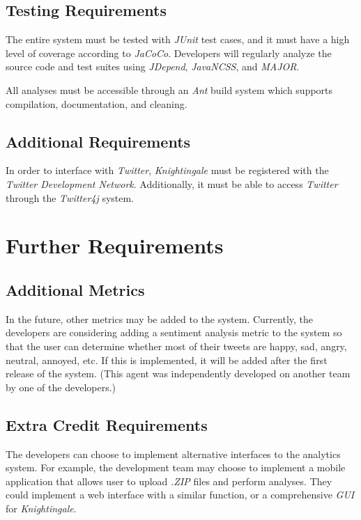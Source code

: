 \documentclass[a4paper, 12pt]{article}
\begin{document}
\subsection{Testing Requirements} \label{sec:testing}
\begin{adjustwidth}{2em}{0pt}
The entire system must be tested with \textit{JUnit} test cases, and it must have a high level of coverage according to \textit{JaCoCo}. Developers will regularly analyze the source code and test suites using \textit{JDepend}, \textit{JavaNCSS}, and \textit{MAJOR}. \newline 

\noindent All analyses must be accessible through an \textit{Ant} build system which supports compilation, documentation, and cleaning.
\end{adjustwidth}

\subsection{Additional Requirements} \label{sec:additional}
\begin{adjustwidth}{2em}{0pt}
In order to interface with \textit{Twitter}, \textit{Knightingale} must be registered with the \textit{Twitter Development Network}. Additionally, it must be able to access \textit{Twitter} through the \textit{Twitter4j} system.
\end{adjustwidth}

\section{Further Requirements} \label{sec:further}
\subsection{Additional Metrics} \label{sec:metrics}
\begin{adjustwidth}{2em}{0pt}
In the future, other metrics may be added to the system. Currently, the developers are considering adding a sentiment analysis metric to the system so that the user can determine whether most of their tweets are happy, sad, angry, neutral, annoyed, etc. If this is implemented, it will be added after the first release of the system. (This agent was independently developed on another team by one of the developers.) 
\end{adjustwidth}

\subsection{Extra Credit Requirements} \label{sec:extracredit}
\begin{adjustwidth}{2em}{0pt}
The developers can choose to implement alternative interfaces to the analytics system. For example, the development team may choose to implement a mobile application that allows user to upload \textit{.ZIP} files and perform analyses. They could implement a web interface with a similar function, or a comprehensive \textit{GUI} for \textit{Knightingale}. 
\end{adjustwidth}
\end{document}
